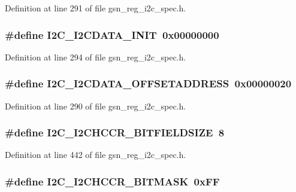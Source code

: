Definition at line 291 of file gsn\_\-reg\_\-i2c\_\-spec.h.

\hypertarget{a00558_a32b2804d53d739e56599c5c47f075f83}{
\subsubsection[{I2C\_\-I2CDATA\_\-INIT}]{\setlength{\rightskip}{0pt plus 5cm}\#define I2C\_\-I2CDATA\_\-INIT~0x00000000}}
\label{a00558_a32b2804d53d739e56599c5c47f075f83}


Definition at line 294 of file gsn\_\-reg\_\-i2c\_\-spec.h.

\hypertarget{a00558_ae7a3d0cf7765c1864dce99ab990914ed}{
\subsubsection[{I2C\_\-I2CDATA\_\-OFFSETADDRESS}]{\setlength{\rightskip}{0pt plus 5cm}\#define I2C\_\-I2CDATA\_\-OFFSETADDRESS~0x00000020}}
\label{a00558_ae7a3d0cf7765c1864dce99ab990914ed}


Definition at line 290 of file gsn\_\-reg\_\-i2c\_\-spec.h.

\hypertarget{a00558_aec9dff7425ac731dde79158928955bd5}{
\subsubsection[{I2C\_\-I2CHCCR\_\-BITFIELDSIZE}]{\setlength{\rightskip}{0pt plus 5cm}\#define I2C\_\-I2CHCCR\_\-BITFIELDSIZE~8}}
\label{a00558_aec9dff7425ac731dde79158928955bd5}


Definition at line 442 of file gsn\_\-reg\_\-i2c\_\-spec.h.

\hypertarget{a00558_af0f236970ad913e5edb3ffd4962f2ddc}{
\subsubsection[{I2C\_\-I2CHCCR\_\-BITMASK}]{\setlength{\rightskip}{0pt plus 5cm}\#define I2C\_\-I2CHCCR\_\-BITMASK~0xFF}}
\label{a00558_af0f236970ad913e5edb3ffd4962f2ddc}


